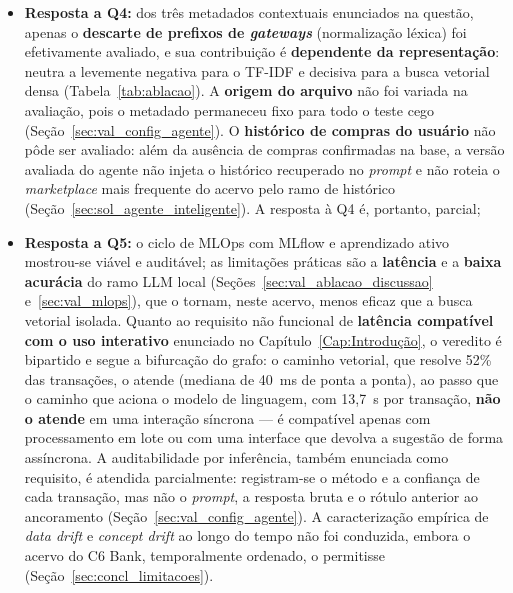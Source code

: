 \begin{itemize}
	\item \textbf{Resposta a Q4:} dos três metadados contextuais enunciados na questão, apenas o \textbf{descarte de prefixos de \textit{gateways}} (normalização léxica) foi efetivamente avaliado, e sua contribuição é \textbf{dependente
	da representação}: neutra a levemente negativa para o TF-IDF e decisiva para a busca vetorial densa (Tabela~\ref{tab:ablacao}). A \textbf{origem do arquivo} não foi variada na avaliação, pois o metadado permaneceu fixo para todo o teste cego (Seção~\ref{sec:val_config_agente}). O \textbf{histórico de compras do usuário} não pôde ser avaliado: além da ausência de compras confirmadas na base, a versão avaliada do agente não injeta o histórico recuperado no \textit{prompt} e não roteia o \textit{marketplace} mais frequente do acervo pelo ramo de histórico (Seção~\ref{sec:sol_agente_inteligente}). A resposta à Q4 é, portanto, parcial;

	\item \textbf{Resposta a Q5:} o ciclo de MLOps com MLflow e aprendizado ativo mostrou-se
	viável e auditável; as limitações práticas são a \textbf{latência} e a \textbf{baixa
	acurácia} do ramo LLM local (Seções~\ref{sec:val_ablacao_discussao} e~\ref{sec:val_mlops}), que o tornam,
	neste acervo, menos eficaz que a busca vetorial isolada. Quanto ao requisito não funcional de \textbf{latência compatível com o uso interativo} enunciado no Capítulo~\ref{Cap:Introdução}, o veredito é bipartido e segue a bifurcação do grafo: o caminho vetorial, que resolve 52\% das transações, o atende (mediana de 40~ms de ponta a ponta), ao passo que o caminho que aciona o modelo de linguagem, com 13,7~s por transação, \textbf{não o atende} em uma interação síncrona --- é compatível apenas com processamento em lote ou com uma interface que devolva a sugestão de forma assíncrona. A auditabilidade por inferência, também enunciada como requisito, é atendida parcialmente: registram-se o método e a confiança de cada transação, mas não o \textit{prompt}, a resposta bruta e o rótulo anterior ao ancoramento (Seção~\ref{sec:val_config_agente}). A caracterização empírica de
	\textit{data drift} e \textit{concept drift} ao longo do tempo não foi conduzida, embora o
	acervo do C6 Bank, temporalmente ordenado, o permitisse (Seção~\ref{sec:concl_limitacoes}).
\end{itemize}

